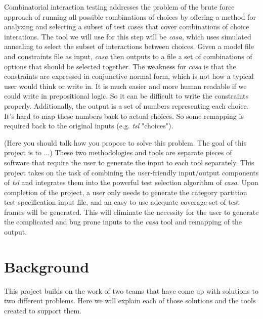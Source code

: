 \documentclass[a4full,12pt]{article}
\newcommand{\eas}[1]{{\color{blue}\sf ({#1})}}
\begin{document}
Combinatorial interaction testing addresses the problem of the brute force approach of running all
  possible combinations of choices by offering a method for analyzing and selecting a subset of test cases
  that cover combinations of choice interations. The tool we will use for this step will be \emph{casa},
  which uses simulated annealing to select the subset of interactions between choices. Given a model file and
  constraints file as input, \emph{casa} then outputs to a file a set of combinations of options that should
  be selected together. The weakness for \emph{casa} is that the constraints are expressed in conjunctive
  normal form, which is not how a typical user would think or write in. It is much easier and more human
  readable if we could write in prepositional logic. So it can be difficult to write the constraints properly.
  Additionally, the output is a set of numbers representing each choice. It's hard to map these numbers back
  to actual choices. So some remapping is required back to the original inputs (e.g. \emph{tsl} "choices").
 
\eas{Here you should talk how you propose to solve this problem. The goal of this project is to ...}
These two methodologies and tools are separate pieces of software that require the user to generate the input
  to each tool separately. This project takes on the task of combining the user-friendly input/output components
  of \emph{tsl} and integrates them into the powerful test selection algorithm of \emph{casa}. Upon completion of
  the project, a user only needs to generate the category partition test specification input file, and an
  easy to use adequate coverage set of test frames will be generated. This will eliminate the necessity for the
  user to generate the complicated and bug prone inputs to the \emph{casa} tool and remapping of the output.
  
\section{Background}
This project builds on the work of two teams that have come up with solutions to
  two different problems. Here we will explain each of those solutions and the 
  tools created to support them.
\end{document}
